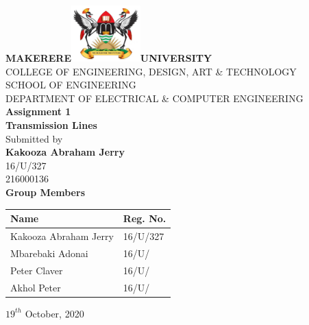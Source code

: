 \documentclass[12pt,a4paper,openright]{report}
\begin{document}
		\begin{titlepage}
			
			\begin{center}
				\Huge{\textbf{MAKERERE}}\includegraphics[width=0.2\textwidth]{logo.png}\Huge{\textbf{UNIVERSITY}}\\[0.5in]
				\Large
				COLLEGE OF ENGINEERING, DESIGN, ART \& TECHNOLOGY\\[0.3in]
				SCHOOL OF ENGINEERING\\[0.3in]
				\large{DEPARTMENT OF ELECTRICAL \& COMPUTER ENGINEERING} \\[.5in]
				
				\Large \textbf {Assignment 1}\\[.3in]
				\Large \textbf {Transmission Lines}\\[.5in]
				
				
				
				\normalsize Submitted by \\[0.2in]
				\textbf{Kakooza Abraham Jerry}\\
				16/U/327\\
				216000136\\
				
				\vspace{.5in}
				\Large \textbf {Group Members}\\[.1in]
				
				\begin{table}[H]
					\begin{center}
						\begin{tabular}{|l|l|}
							\hline
							Name & Reg. No.\\ \hline
							Kakooza Abraham Jerry & 16/U/327 \\ \hline
							Mbarebaki Adonai & 16/U/ \\ \hline
							Peter Claver & 16/U/ \\ \hline
							Akhol Peter & 16/U/ \\ \hline
						\end{tabular}
					\end{center}
				\end{table}
				
				
				\vfill
				\normalsize
				$19^{th}$ October, 2020
				
				
				
			\end{center}
			
		\end{titlepage}
	
\end{document}
